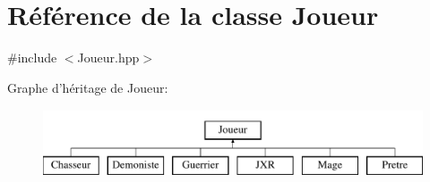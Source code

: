 \hypertarget{class_joueur}{\section{Référence de la classe Joueur}
\label{class_joueur}
}


{\ttfamily \#include $<$Joueur.\-hpp$>$}

Graphe d'héritage de Joueur\-:\begin{figure}[H]
\begin{center}
\leavevmode
\includegraphics[height=2.000000cm]{class_joueur}
\end{center}
\end{figure}
